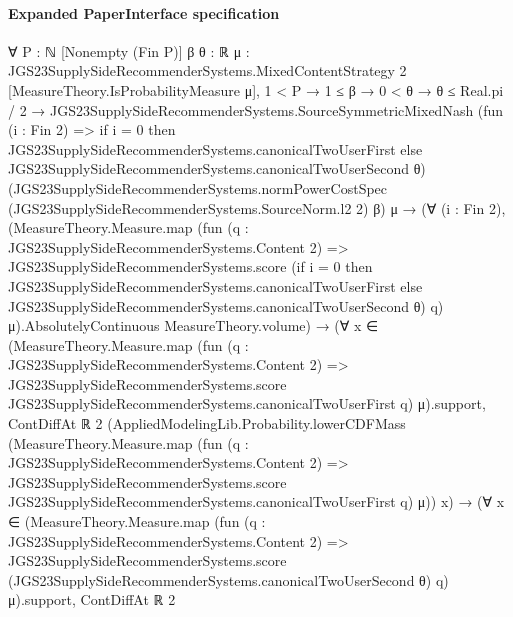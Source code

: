 \documentclass[10pt]{article}
\begin{document}
\paragraph{Expanded PaperInterface specification}
\begin{ReviewVerbatim}
∀ {P : ℕ} [Nonempty (Fin P)] {β θ : ℝ} {μ : JGS23SupplySideRecommenderSystems.MixedContentStrategy 2}
  [MeasureTheory.IsProbabilityMeasure μ],
  1 < P →
    1 ≤ β →
      0 < θ →
        θ ≤ Real.pi / 2 →
          JGS23SupplySideRecommenderSystems.SourceSymmetricMixedNash
              (fun (i : Fin 2) =>
                if i = 0 then JGS23SupplySideRecommenderSystems.canonicalTwoUserFirst
                else JGS23SupplySideRecommenderSystems.canonicalTwoUserSecond θ)
              (JGS23SupplySideRecommenderSystems.normPowerCostSpec (JGS23SupplySideRecommenderSystems.SourceNorm.l2 2)
                β)
              μ →
            (∀ (i : Fin 2),
                (MeasureTheory.Measure.map
                      (fun (q : JGS23SupplySideRecommenderSystems.Content 2) =>
                        JGS23SupplySideRecommenderSystems.score
                          (if i = 0 then JGS23SupplySideRecommenderSystems.canonicalTwoUserFirst
                          else JGS23SupplySideRecommenderSystems.canonicalTwoUserSecond θ)
                          q)
                      μ).AbsolutelyContinuous
                  MeasureTheory.volume) →
              (∀
                  x ∈
                    (MeasureTheory.Measure.map
                        (fun (q : JGS23SupplySideRecommenderSystems.Content 2) =>
                          JGS23SupplySideRecommenderSystems.score
                            JGS23SupplySideRecommenderSystems.canonicalTwoUserFirst q)
                        μ).support,
                  ContDiffAt ℝ 2
                    (AppliedModelingLib.Probability.lowerCDFMass
                      (MeasureTheory.Measure.map
                        (fun (q : JGS23SupplySideRecommenderSystems.Content 2) =>
                          JGS23SupplySideRecommenderSystems.score
                            JGS23SupplySideRecommenderSystems.canonicalTwoUserFirst q)
                        μ))
                    x) →
                (∀
                    x ∈
                      (MeasureTheory.Measure.map
                          (fun (q : JGS23SupplySideRecommenderSystems.Content 2) =>
                            JGS23SupplySideRecommenderSystems.score
                              (JGS23SupplySideRecommenderSystems.canonicalTwoUserSecond θ) q)
                          μ).support,
                    ContDiffAt ℝ 2

\end{ReviewVerbatim}
\end{document}
